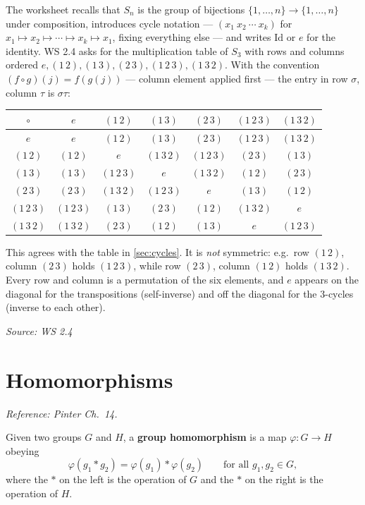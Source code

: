 \documentclass[11pt]{report}
\newcommand{\srcline}[1]{\par\hfill{\footnotesize\textit{Source: #1}}}
\begin{document}
\begin{exbox}[{Table of $S_3$}]\label{ex:table-s3}
The worksheet recalls that $S_n$ is the group of bijections $\{1, \ldots, n\} \to \{1, \ldots, n\}$ under composition, introduces cycle notation --- $(x_1\ x_2\ \cdots\ x_k)$ for $x_1 \mapsto x_2 \mapsto \cdots \mapsto x_k \mapsto x_1$, fixing everything else --- and writes $\mathrm{Id}$ or $e$ for the identity. WS 2.4 asks for the multiplication table of $S_3$ with rows and columns ordered $e, (1\,2), (1\,3), (2\,3), (1\,2\,3), (1\,3\,2)$. With the convention $(f \circ g)(j) = f(g(j))$ --- column element applied first --- the entry in row $\sigma$, column $\tau$ is $\sigma\tau$:
\begin{center}
\begin{tabular}{c|cccccc}
$\circ$ & $e$ & $(1\,2)$ & $(1\,3)$ & $(2\,3)$ & $(1\,2\,3)$ & $(1\,3\,2)$ \\ \hline
$e$ & $e$ & $(1\,2)$ & $(1\,3)$ & $(2\,3)$ & $(1\,2\,3)$ & $(1\,3\,2)$ \\
$(1\,2)$ & $(1\,2)$ & $e$ & $(1\,3\,2)$ & $(1\,2\,3)$ & $(2\,3)$ & $(1\,3)$ \\
$(1\,3)$ & $(1\,3)$ & $(1\,2\,3)$ & $e$ & $(1\,3\,2)$ & $(1\,2)$ & $(2\,3)$ \\
$(2\,3)$ & $(2\,3)$ & $(1\,3\,2)$ & $(1\,2\,3)$ & $e$ & $(1\,3)$ & $(1\,2)$ \\
$(1\,2\,3)$ & $(1\,2\,3)$ & $(1\,3)$ & $(2\,3)$ & $(1\,2)$ & $(1\,3\,2)$ & $e$ \\
$(1\,3\,2)$ & $(1\,3\,2)$ & $(2\,3)$ & $(1\,2)$ & $(1\,3)$ & $e$ & $(1\,2\,3)$
\end{tabular}
\end{center}
This agrees with the table in \ref{sec:cycles}. It is \emph{not} symmetric: e.g.\ row $(1\,2)$, column $(2\,3)$ holds $(1\,2\,3)$, while row $(2\,3)$, column $(1\,2)$ holds $(1\,3\,2)$. Every row and column is a permutation of the six elements, and $e$ appears on the diagonal for the transpositions (self-inverse) and off the diagonal for the $3$-cycles (inverse to each other).
\srcline{WS 2.4}
\end{exbox}

\section{Homomorphisms}\label{sec:homs}

\textit{Reference: Pinter Ch.\ 14.}

\begin{defbox}\label{def:group-homomorphism}
Given two groups $G$ and $H$, a \textbf{group homomorphism} is a map $\varphi: G \to H$ obeying
\[ \varphi(g_1 * g_2) = \varphi(g_1) * \varphi(g_2) \qquad \text{for all } g_1, g_2 \in G, \]
where the $*$ on the left is the operation of $G$ and the $*$ on the right is the operation of $H$.
\end{defbox}
\end{document}
